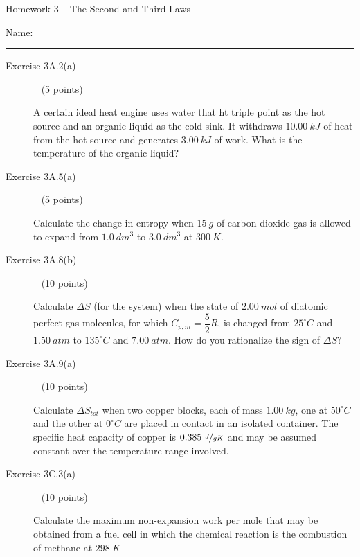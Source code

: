 \documentclass[12pt, openany, letterpaper]{memoir}
\begin{document}
\begin{center}
	{\large Homework 3 -- The Second and Third Laws}
\end{center}

Name: \rule[-.1mm]{15em}{0.1pt}

\begin{description}	
	\item [Exercise 3A.2(a)] ~ (5 points)
	
	A certain ideal heat engine uses water that ht triple point as the hot source and an organic liquid as the cold sink. It withdraws $10.00~kJ$ of heat from the hot source and generates $3.00~kJ$ of work. What is the temperature of the organic liquid?
	
	\vspace{15em}
	\item [Exercise 3A.5(a)] ~ (5 points)
	
	Calculate the change in entropy when $15~g$ of carbon dioxide gas is allowed to expand from $1.0~dm^3$ to $3.0~dm^3$ at $300~K$.
	
	\vspace{15em}\newpage
	\item [Exercise 3A.8(b)] ~ (10 points)
	
	Calculate $\Delta S$ (for the system) when the state of $2.00~mol$ of diatomic perfect gas molecules, for which $C_{p,m}=\dfrac{5}{2}R$, is changed from $25^\circ C$ and $1.50~atm$ to $135^\circ C$ and $7.00~atm$. How do you rationalize the sign of $\Delta S$?
	
	\vspace{21em}

	\item [Exercise 3A.9(a)] ~ (10 points)
	
	Calculate $\Delta S_{tot}$ when two copper blocks, each of mass $1.00~kg$, one at $50^\circ C$ and the other at $0^\circ C$ are placed in contact in an isolated container. The specific heat capacity of copper is $0.385~\nicefrac{J}{gK}$ and may be assumed constant over the temperature range involved.
	
	\vspace{21em}
	
	\item [Exercise 3C.3(a)] ~ (10 points)
	
	Calculate the maximum non-expansion work per mole that may be obtained from a fuel cell in which the chemical reaction is the combustion of methane at $298~K$

	\vspace{20em}
	

\end{description}
\end{document}

